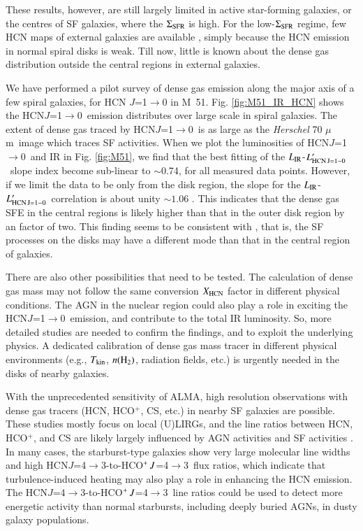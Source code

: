 \documentclass[legal,11pt]{article}
\def\,{\thinspace}
\def\Tkin{$T_{\rm kin}$}
\def\to{$\rightarrow$}
\def\mum{$\mu$m}
\def\nHtwo{$n({\rm H}_2)$}
\def\LIR     {$L_{\rm IR}$}
\def\LHCNoz  {$L'_{\rm HCN\, J=1-0}$}
\def\HCOP       {HCO$^{+}$}
\def\HCNoz      {HCN\,$J$=1$\rightarrow$0}
\def\HCNft        {HCN\,$J$=4$\rightarrow$3}
\def\HCOPft     {HCO$^+\,J$=4$\rightarrow$3}
\begin{document}
These results, however, are still largely limited in active star-forming
galaxies, or the centres of SF galaxies, where the $\Sigma_{\rm SFR}$ is high.
For the low-$\Sigma_{\rm SFR}$ regime, few HCN maps of external galaxies are
available \citep[e.g.,][]{Nguyen1992,gs04a,Kepley2014}, simply because the HCN
emission in normal spiral disks is weak. Till now, little is known about the
dense gas distribution outside the central regions in external galaxies. 

We have performed a  pilot survey of dense gas emission along the major axis of
a few spiral galaxies, for HCN $J$=1\to0 in M~51. Fig. \ref{fig:M51_IR_HCN}
shows the \HCNoz\ emission distributes over large scale in spiral galaxies. The
extent of dense gas traced by \HCNoz\ is as large as the {\it Herschel} 70 \mum\
image which traces SF activities.  When we plot the luminosities of \HCNoz\ and
IR in Fig. \ref{fig:M51}, we find that the best fitting of the \LIR-\LHCNoz\
slope index become sub-linear to $\sim$0.74, for all measured data points.
However, if we limit the data to be only from the disk region, the slope for
the \LIR-\LHCNoz\ correlation is about unity $\sim 1.06$ \citep{Chen15}. This
indicates that the dense gas SFE in the central regions is likely higher than
that in the outer disk region by an factor of two. This finding seems to be
consistent with \citep{usero15}, that is, the SF processes on the disks may
have a different mode than that in the central region of galaxies.


There are also other possibilities that need to be tested. The calculation of
dense gas mass may not follow the same conversion $X_{\rm HCN}$ factor in
different physical conditions. The AGN in the nuclear region could also play a
role in exciting the \HCNoz\ emission, and contribute to the total IR
luminosity.  So, more detailed studies are needed to confirm the findings, and
to exploit the underlying physics. A dedicated calibration of dense gas mass
tracer in different physical environments (e.g., \Tkin, \nHtwo, radiation
fields, etc.) is urgently needed in the disks of nearby galaxies.





With the unprecedented sensitivity of ALMA, high resolution observations with
dense gas tracers (HCN, \HCOP, CS, etc.) in nearby SF galaxies are possible.
These studies mostly focus on local (U)LIRGs, and the line ratios between HCN,
\HCOP, and CS are likely largely influenced  by AGN activities
\citep[e.g.,][]{Izumi2013,Martin2015,GB2014, Imanishi2014} and SF activities
\citep[e.g.,][]{Meier2015}. In many cases, the starburst-type galaxies show
very large molecular line widths and high \HCNft-to-\HCOPft\ flux ratios, which
indicate that turbulence-induced heating may also play a role in enhancing the
HCN emission. The \HCNft-to-\HCOPft\ line ratios could be used to detect more
energetic activity than normal starbursts, including deeply buried AGNs, in
dusty galaxy populations\citep[e.g.,][]{Imanishi2014}.  
\end{document}
